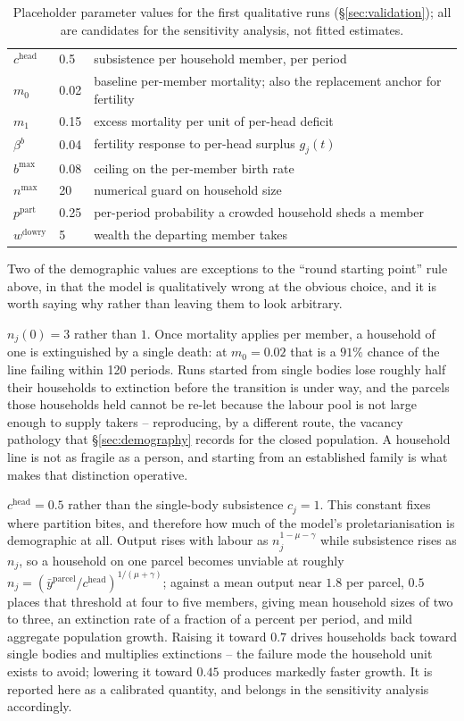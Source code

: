 \documentclass[11pt,english]{article}
\begin{document}
\begin{table}[H]
\begin{tabular}{@{}llp{6.2cm}@{}}
$c^{\text{head}}$ & 0.5 & subsistence per household member, per period \\
$m_0$ & 0.02 & baseline per-member mortality; also the replacement anchor for fertility \\
$m_1$ & 0.15 & excess mortality per unit of per-head deficit \\
$\beta^{b}$ & 0.04 & fertility response to per-head surplus $g_j(t)$ \\
$b^{\max}$ & 0.08 & ceiling on the per-member birth rate \\
$n^{\max}$ & 20 & numerical guard on household size \\
$p^{\text{part}}$ & 0.25 & per-period probability a crowded household sheds a member \\
$w^{\text{dowry}}$ & 5 & wealth the departing member takes \\
\bottomrule
\end{tabular}
\caption{Placeholder parameter values for the first qualitative runs (\S\ref{sec:validation}); all are candidates for the sensitivity analysis, not fitted estimates.}
\label{tab:params}
\end{table}

Two of the demographic values are exceptions to the ``round starting point'' rule above, in that the model is qualitatively wrong at the obvious choice, and it is worth saying why rather than leaving them to look arbitrary.

$n_j(0)=3$ rather than $1$. Once mortality applies per member, a household of one is extinguished by a single death: at $m_0=0.02$ that is a $91\%$ chance of the line failing within 120 periods. Runs started from single bodies lose roughly half their households to extinction before the transition is under way, and the parcels those households held cannot be re-let because the labour pool is not large enough to supply takers -- reproducing, by a different route, the vacancy pathology that \S\ref{sec:demography} records for the closed population. A household line is not as fragile as a person, and starting from an established family is what makes that distinction operative.

$c^{\text{head}}=0.5$ rather than the single-body subsistence $c_j=1$. This constant fixes where partition bites, and therefore how much of the model's proletarianisation is demographic at all. Output rises with labour as $n_j^{1-\mu-\gamma}$ while subsistence rises as $n_j$, so a household on one parcel becomes unviable at roughly $n_j = (\bar y^{\text{parcel}}/c^{\text{head}})^{1/(\mu+\gamma)}$; against a mean output near $1.8$ per parcel, $0.5$ places that threshold at four to five members, giving mean household sizes of two to three, an extinction rate of a fraction of a percent per period, and mild aggregate population growth. Raising it toward $0.7$ drives households back toward single bodies and multiplies extinctions -- the failure mode the household unit exists to avoid; lowering it toward $0.45$ produces markedly faster growth. It is reported here as a calibrated quantity, and belongs in the sensitivity analysis accordingly.
\end{document}
